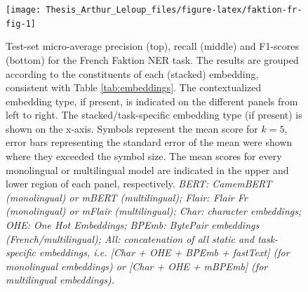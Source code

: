 \documentclass[12pt,a4paper,]{book}
\begin{document}
\begin{figure}

{\centering \texttt{[image: Thesis\_Arthur\_Leloup\_files/figure-latex/faktion-fr-fig-1]} 

}

\caption{Test-set micro-average precision (top), recall (middle) and F1-scores (bottom) for the French Faktion NER task. The results are grouped according to the constituents of each (stacked) embedding, consistent with Table \ref{tab:embeddings}. The contextualized embedding type, if present, is indicated on the different panels from left to right. The stacked/task-specific embedding type (if present) is shown on the x-axis. Symbols represent the mean score for \(k = 5\), error bars representing the standard error of the mean were shown where they exceeded the symbol size. The mean scores for every monolingual or multilingual model are indicated in the upper and lower region of each panel, respectively. \emph{BERT: CamemBERT (monolingual) or mBERT (multilingual); Flair: Flair Fr (monolingual) or mFlair (multilingual); Char: character embeddings; OHE: One Hot Embeddings; BPEmb: BytePair embeddings (French/multilingual); All: concatenation of all static and task-specific embeddings, i.e. {[}Char + OHE + BPEmb + fastText{]} (for monolingual embeddings) or {[}Char + OHE + mBPEmb{]} (for multilingual embeddings).}}\label{fig:faktion-fr-fig}
\end{figure}
\end{document}
